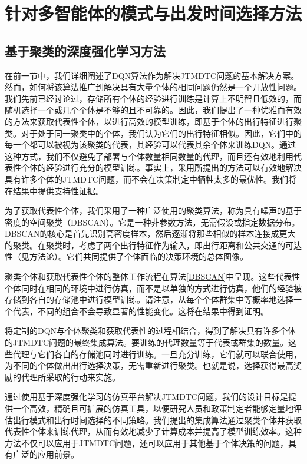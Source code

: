 \chapter{针对多智能体的模式与出发时间选择方法}
\label{chp:bib}

\section{基于聚类的深度强化学习方法}

在前一节中，我们详细阐述了DQN算法作为解决JTMDTC问题的基本解决方案。然而，如何将该算法推广到解决具有大量个体的相同问题仍然是一个开放性问题。我们先前已经讨论过，存储所有个体的经验进行训练是计算上不明智且低效的，而随机选择一个或几个个体是不够的且不可靠的。因此，我们提出了一种优雅而有效的方法来获取代表性个体，以进行高效的模型训练，即基于个体的出行特征进行聚类。对于处于同一聚类中的个体，我们认为它们的出行特征相似。因此，它们中的每一个都可以被视为该聚类的代表，其经验可以代表其余个体来训练DQN。通过这种方式，我们不仅避免了部署与个体数量相同数量的代理，而且还有效地利用代表性个体的经验进行充分的模型训练。事实上，采用所提出的方法可以有效地解决具有许多个体的JTMDTC问题，而不会在决策制定中牺牲太多的最优性。我们将在结果中提供支持性证据。

为了获取代表性个体，我们采用了一种广泛使用的聚类算法，称为具有噪声的基于密度的空间聚类（DBSCAN）\citep{ester1996density}。它是一种非参数方法，无需假设或指定数据分布。DBSCAN的核心是首先识别高密度样本，然后逐渐将那些相似的样本连接成更大的聚类。在聚类时，考虑了两个出行特征作为输入，即出行距离和公共交通的可达性（见方法论）。它们共同提供了个体面临的决策环境的总体图像。

聚类个体和获取代表性个体的整体工作流程在算法\ref{DBSCAN}中呈现。这些代表性个体同时在相同的环境中进行仿真，而不是以单独的方式进行仿真，他们的经验被存储到各自的存储池中进行模型训练。请注意，从每个个体群集中等概率地选择一个代表，不同的组合不会导致显著的性能变化。这将在结果中得到证明。

将定制的DQN与个体聚类和获取代表性的过程相结合，得到了解决具有许多个体的JTMDTC问题的最终集成算法。要训练的代理数量等于代表或群集的数量。这些代理与它们各自的存储池同时进行训练。一旦充分训练，它们就可以联合使用，为不同的个体做出出行选择决策，无需重新进行聚类。也就是说，选择获得最高奖励的代理所采取的行动来实施。

通过使用基于深度强化学习的仿真平台解决JTMDTC问题，我们的设计目标是提供一个高效，精确且可扩展的仿真工具，以便研究人员和政策制定者能够定量地评估出行模式和出行时间选择的不同策略。我们提出的集成算法通过聚类个体并获取代表性个体来训练代理，从而有效地减少了计算成本并提高了模型训练效率。这种方法不仅可以应用于JTMDTC问题，还可以应用于其他基于个体决策的问题，具有广泛的应用前景。

